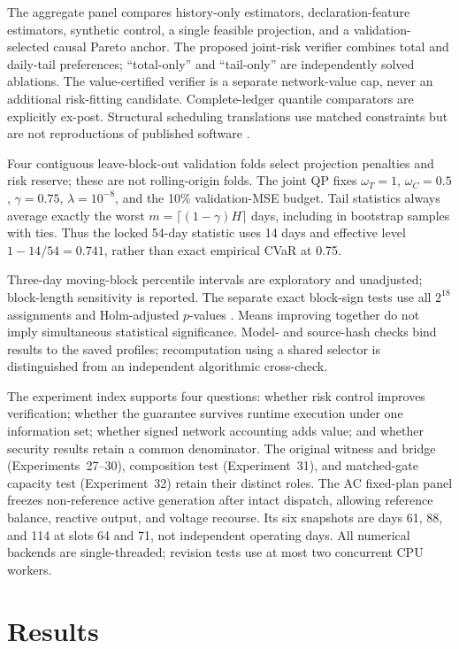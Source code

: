 \documentclass[10pt,journal]{IEEEtran}
\newcommand{\RiskSafe}{joint-risk verifier}
\newcommand{\PaymentSafe}{value-certified verifier}
\begin{document}
The aggregate panel compares history-only estimators, declaration-feature
estimators, synthetic control, a single feasible projection, and a
validation-selected causal Pareto anchor. The proposed \RiskSafe{} combines
total and daily-tail preferences; ``total-only'' and ``tail-only'' are
independently solved ablations. The \PaymentSafe{} is a separate network-value
cap, never an additional risk-fitting candidate. Complete-ledger quantile
comparators are explicitly ex-post. Structural scheduling translations use
matched constraints but are not reproductions of published software
\cite{cao2022flexibility,chen2021idccoupling}.

Four contiguous leave-block-out validation folds select projection penalties
and risk reserve; these are not rolling-origin folds. The joint QP fixes
$\omega_T=1$, $\omega_C=0.5$, $\gamma=0.75$, $\lambda=10^{-8}$, and the
10\% validation-MSE budget. Tail statistics always average exactly the worst
$m=\lceil(1-\gamma)H\rceil$ days, including in bootstrap samples with ties.
Thus the locked 54-day statistic uses 14 days and effective level
$1-14/54=0.741$, rather than exact empirical CVaR at 0.75.

Three-day moving-block percentile intervals are exploratory and unadjusted;
block-length sensitivity is reported. The separate exact block-sign tests
use all $2^{18}$ assignments and Holm-adjusted $p$-values
\cite{kunsch1989bootstrap,holm1979multiple}. Means improving together do not
imply simultaneous statistical significance. Model- and source-hash checks
bind results to the saved profiles; recomputation using a shared selector is
distinguished from an independent algorithmic cross-check.

The experiment index supports four questions: whether risk control improves
verification; whether the guarantee survives runtime execution under one
information set; whether signed network accounting adds value; and whether
security results retain a common denominator. The original witness and
bridge (Experiments~27--30), composition test (Experiment~31), and matched-gate
capacity test (Experiment~32) retain their distinct roles. The AC fixed-plan
panel freezes non-reference active generation after intact dispatch, allowing
reference balance, reactive output, and voltage recourse. Its six snapshots
are days 61, 88, and 114 at slots 64 and 71, not independent operating days.
All numerical backends are single-threaded; revision tests use at most two
concurrent CPU workers.

\section{Results}\label{sec:results}
\end{document}
